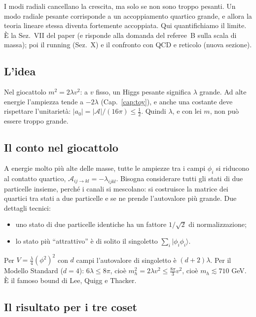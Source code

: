 \documentclass[11pt,a4paper]{article}
\numberwithin{equation}{section}
\theoremstyle{remark}
\begin{document}
\begin{dove}
I modi radiali cancellano la crescita, ma solo se non sono troppo pesanti. Un modo radiale pesante corrisponde a un accoppiamento quartico grande, e allora la teoria lineare stessa diventa fortemente accoppiata. Qui quantifichiamo il limite. È la Sez.~VII del paper (e risponde alla domanda del referee~B sulla scala di massa); poi il running (Sez.~X) e il confronto con QCD e reticolo (nuova sezione).
\end{dove}

\subsection{L'idea}

Nel giocattolo $m^2=2\lambda v^2$: a $v$ fisso, un Higgs pesante significa $\lambda$ grande. Ad alte energie l'ampiezza tende a $-2\lambda$ (Cap.~\ref{cap:toy}), e anche una costante deve rispettare l'unitarietà: $|a_0|=|\mathcal A|/(16\pi)\le\frac12$. Quindi $\lambda$, e con lei $m$, non può essere troppo grande.

\subsection{Il conto nel giocattolo}

A energie molto più alte delle masse, tutte le ampiezze tra i campi $\phi_i$ si riducono al contatto quartico, $\mathcal A_{ij\to kl}=-\lambda_{ijkl}$. Bisogna considerare tutti gli stati di due particelle insieme, perché i canali si mescolano: si costruisce la matrice dei quartici tra stati a due particelle e se ne prende l'autovalore più grande. Due dettagli tecnici:
\begin{itemize}[nosep]
\item uno stato di due particelle identiche ha un fattore $1/\sqrt2$ di normalizzazione;
\item lo stato più ``attrattivo'' è di solito il singoletto $\sum_i|\phi_i\phi_i\rangle$.
\end{itemize}
Per $V=\frac\lambda4(\phi^2)^2$ con $d$ campi l'autovalore di singoletto è $(d+2)\lambda$. Per il Modello Standard ($d=4$): $6\lambda\le8\pi$, cioè $m_h^2=2\lambda v^2\le\frac{8\pi}{3}v^2$, cioè $m_h\lesssim710$ GeV. È il famoso bound di Lee, Quigg e Thacker.

\subsection{Il risultato per i tre coset}
\end{document}
